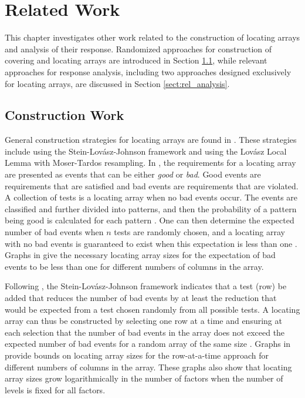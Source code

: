 \chapter{Related Work} \label{chptr:related}

This chapter investigates other work related to the construction of locating arrays and analysis of their response.
Randomized approaches for construction of covering and locating arrays are introduced in Section \ref{sect:rel_construction}, while relevant approaches for response analysis, including two approaches designed exclusively for locating arrays, are discussed in Section \ref{sect:rel_analysis}.

\section{Construction Work} \label{sect:rel_construction}

General construction strategies for locating arrays are found in \cite{CSmics}.
These strategies include using the Stein-Lov\'asz-Johnson framework and using the Lov{\'a}sz Local Lemma with Moser-Tardos resampling.
In \cite{CSmics}, the requirements for a locating array are presented as events that can be either {\em good} or {\em bad}.
Good events are requirements that are satisfied and bad events are requirements that are violated.
A collection of tests is a locating array when no bad events occur.
The events are classified and further divided into patterns, and then the probability of a pattern being good is calculated for each pattern \cite{CSmics}.
One can then determine the expected number of bad events when $n$ tests are randomly chosen, and a locating array with no bad events is guaranteed to exist when this expectation is less than one \cite{CSmics}.
Graphs in \cite{CSmics} give the necessary locating array sizes for the expectation of bad events to be less than one for different numbers of columns in the array.

Following \cite{seidelIWOCA}, the Stein-Lov\'asz-Johnson framework \cite{Stein74,Lovasz75,Johnson74} indicates that a test (row) be added that reduces the number of bad events by at least the reduction that would be expected from a test chosen randomly from all possible tests.
A locating array can thus be constructed by selecting one row at a time and ensuring at each selection that the number of bad events in the array does not exceed the expected number of bad events for a random array of the same size \cite{CSmics}.
Graphs in \cite{CSmics} provide bounds on locating array sizes for the row-at-a-time approach for different numbers of columns in the array.
These graphs also show that locating array sizes grow logarithmically in the number of factors when the number of levels is fixed for all factors.

